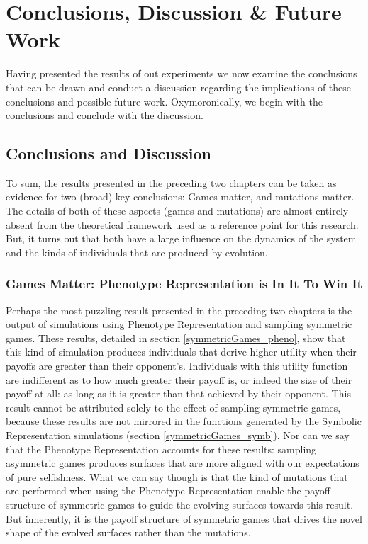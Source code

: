 \documentclass[11pt]{book}
\begin{document}
\chapter{Conclusions, Discussion \& Future Work}\label{conclusions_and_discussion}

Having presented the results of out experiments we now examine the conclusions that can be drawn and conduct a discussion regarding the implications of these conclusions and possible future work.
Oxymoronically, we begin with the conclusions and conclude with the discussion.

\section{Conclusions and Discussion}\label{conclusions}

To sum, the results presented in the preceding two chapters can be taken as evidence for two (broad) key conclusions: Games matter, and mutations matter.
The details of both of these aspects (games and mutations) are almost entirely absent from the theoretical framework used as a reference point for this research.
But, it turns out that both have a large influence on the dynamics of the system and the kinds of individuals that are produced by evolution.


\subsection[Games Matter]{Games Matter: Phenotype Representation is In It To Win It}\label{win_it}
Perhaps the most puzzling result presented in the preceding two chapters is the output of simulations using Phenotype Representation and sampling symmetric games.
These results, detailed in section \ref{symmetricGames_pheno}, show that this kind of simulation produces individuals
that derive higher utility when their payoffs are greater than their opponent's.
Individuals with this utility function are indifferent as to how much greater their payoff is, or indeed the size of their payoff at all: as long as it is greater than that achieved by their opponent.
This result cannot be attributed solely to the effect of sampling symmetric games, because these results are not mirrored in the functions generated by the Symbolic Representation simulations (section \ref{symmetricGames_symb}).
Nor can we say that the Phenotype Representation accounts for these results: sampling asymmetric games produces surfaces that are more aligned with our expectations of pure selfishness.
What we can say though is that the kind of mutations that are performed when using the Phenotype Representation enable the payoff-structure of symmetric games to guide the evolving surfaces towards this result.
But inherently, it is the payoff structure of symmetric games that drives the novel shape of the evolved surfaces rather than the mutations.
\end{document}
